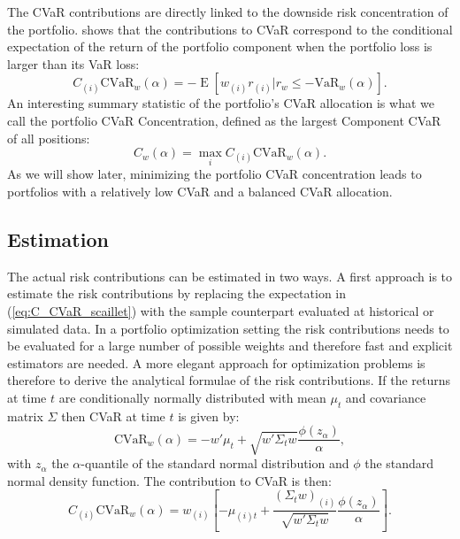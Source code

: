 \documentclass[12pt,a4paper]{article}
\DeclareMathOperator{\E}{\operatorname{E}}
\begin{document}
 The CVaR contributions are directly linked to the downside risk concentration of the portfolio. \citet{Scaillet2002} shows that the contributions to CVaR correspond to the conditional expectation of the return of the portfolio component when the portfolio loss is larger than its VaR loss:
 \begin{equation} C_{(i)}\mbox{CVaR}_w(\alpha) = - \E[w_{(i)}r_{(i)} | r_w \leq -\mbox{VaR}_w(\alpha)]. \label{eq:C_CVaR_scaillet} \end{equation}
 An interesting summary statistic of the portfolio's CVaR allocation is what we call the portfolio CVaR Concentration, defined as the largest Component CVaR of all positions:
\begin{equation}  C_w(\alpha) = \max_i C_{(i)}\mbox{CVaR}_w(\alpha) .\label{eq:CVaRConc} \end{equation} As we will show later, minimizing the portfolio CVaR concentration leads to portfolios with a relatively low CVaR and a balanced CVaR allocation.



\subsection{Estimation}

The actual risk contributions can be estimated in two ways. A first approach is to estimate the risk contributions by replacing the expectation in (\ref{eq:C_CVaR_scaillet}) with the sample counterpart evaluated at historical or simulated data.  In a portfolio optimization setting the risk contributions needs to be evaluated for a large number of possible weights and therefore fast and explicit estimators are needed.  A more elegant approach for optimization problems is therefore to derive the analytical formulae of the risk contributions.  If the returns at time $t$ are conditionally normally distributed with mean $\mu_t$  and covariance matrix $\Sigma$ then CVaR at time $t$ is given by:
\begin{equation}  \mbox{CVaR}_w(\alpha) = -w'\mu_t + \sqrt{w'\Sigma_t w} \frac{\phi(z_\alpha)}{\alpha}, \end{equation}
with $z_\alpha$ the $\alpha$-quantile of the standard normal distribution and $\phi$ the standard normal density function. The contribution to CVaR is then:
\begin{equation}  C_{(i)}\mbox{CVaR}_w(\alpha) = w_{(i)}\left[-\mu_{(i)t} + \frac{(\Sigma_t w)_{(i)}}{\sqrt{w'\Sigma_t w}}\frac{\phi(z_\alpha)}{\alpha}\right]. \end{equation}
\end{document}
